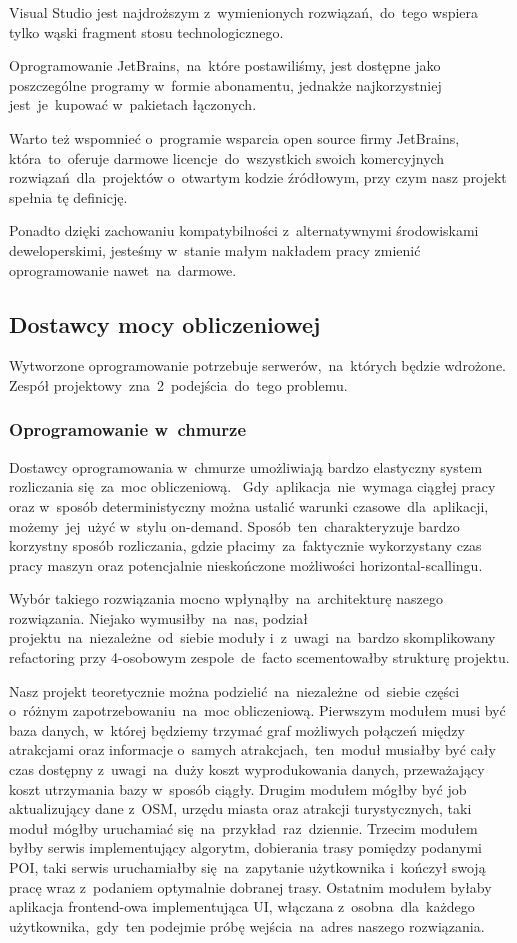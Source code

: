 Visual Studio jest najdroższym z~wymienionych rozwiązań,~do~tego wspiera tylko wąski fragment stosu technologicznego.

Oprogramowanie JetBrains,~na~które postawiliśmy, jest dostępne jako poszczególne programy w~formie abonamentu, jednakże najkorzystniej jest~je~kupować w~pakietach łączonych.

Warto też wspomnieć o~programie wsparcia open source firmy JetBrains, która~to~oferuje darmowe licencje~do~wszystkich swoich komercyjnych rozwiązań~dla~projektów o~otwartym kodzie źródłowym, przy czym nasz projekt spełnia tę definicję.

Ponadto dzięki zachowaniu kompatybilności z~alternatywnymi środowiskami deweloperskimi, jesteśmy w~stanie małym nakładem pracy zmienić oprogramowanie nawet~na~darmowe.

\subsection{Dostawcy mocy obliczeniowej}
\label{subsec:dostawcy-mocy-obliczeniowej}
Wytworzone oprogramowanie potrzebuje serwerów,~na~których będzie wdrożone.
Zespół projektowy~zna~2~podejścia~do~tego problemu.

\subsubsection{Oprogramowanie w~chmurze}
Dostawcy oprogramowania w~chmurze umożliwiają bardzo elastyczny system rozliczania się~za~moc obliczeniową.
~Gdy~aplikacja~nie~wymaga ciągłej pracy oraz w~sposób deterministyczny można ustalić warunki czasowe~dla~aplikacji, możemy~jej~użyć w~stylu \gls{on-demand}.
Sposób~ten~charakteryzuje bardzo korzystny sposób rozliczania, gdzie płacimy~za~faktycznie wykorzystany czas pracy maszyn oraz potencjalnie nieskończone możliwości horizontal-scallingu.

Wybór takiego rozwiązania mocno wpłynąłby~na~architekturę naszego rozwiązania.
Niejako wymusiłby~na~nas, podział projektu~na~niezależne~od~siebie moduły i~z~uwagi~na~bardzo skomplikowany \gls{refactoring} przy 4-osobowym zespole~de~facto scementowałby strukturę projektu.

Nasz projekt teoretycznie można podzielić~na~niezależne~od~siebie części o~różnym zapotrzebowaniu~na~moc obliczeniową.
Pierwszym modułem musi być baza danych, w~której będziemy trzymać graf możliwych połączeń między atrakcjami oraz informacje o~samych atrakcjach,~ten~moduł musiałby być cały czas dostępny z~uwagi~na~duży koszt wyprodukowania danych, przeważający koszt utrzymania bazy w~sposób ciągły.
Drugim modułem mógłby być \gls{job} aktualizujący dane z~OSM, urzędu miasta oraz atrakcji turystycznych, taki moduł mógłby uruchamiać się~na~przykład~raz~dziennie.
Trzecim modułem byłby serwis implementujący algorytm, dobierania trasy pomiędzy podanymi POI, taki serwis uruchamiałby się~na~zapytanie użytkownika i~kończył swoją pracę wraz z~podaniem optymalnie dobranej trasy.
Ostatnim modułem byłaby aplikacja \gls{frontend}-owa implementująca UI, włączana z~osobna~dla~każdego użytkownika,~gdy~ten podejmie próbę wejścia~na~adres naszego rozwiązania.

